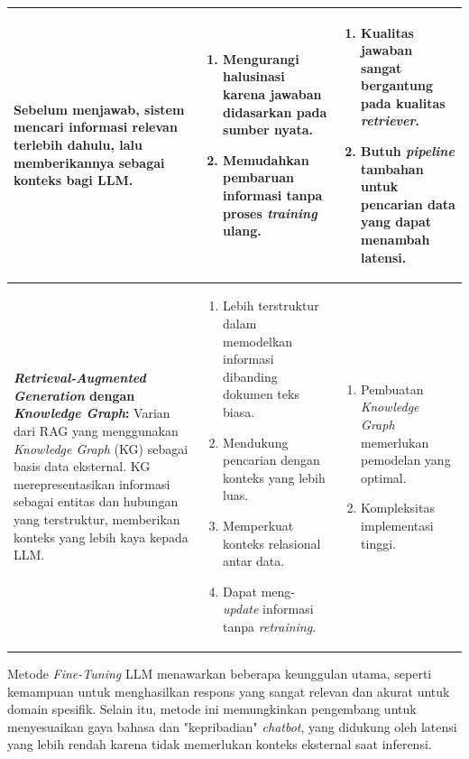\begin{longtable}{|p{4cm}|p{5cm}|p{5cm}|}
	Sebelum menjawab, sistem mencari informasi relevan terlebih dahulu, lalu memberikannya sebagai konteks bagi LLM.
	                &
	\begin{enumerate}
		\item Mengurangi halusinasi karena jawaban didasarkan pada sumber nyata.
		\item Memudahkan pembaruan informasi tanpa proses \textit{training} ulang.
	\end{enumerate}
	                &
	\begin{enumerate}
		\item Kualitas jawaban sangat bergantung pada kualitas \textit{retriever}.
		\item Butuh \textit{pipeline} tambahan untuk pencarian data yang dapat menambah latensi.
	\end{enumerate}
	\\
	\hline
	\textbf{\textit{Retrieval-Augmented Generation} dengan \textit{Knowledge Graph}: }
	Varian dari RAG yang menggunakan \textit{Knowledge Graph} (KG) sebagai basis data eksternal.
	KG merepresentasikan informasi sebagai entitas dan hubungan yang terstruktur, memberikan konteks yang lebih kaya kepada LLM.
	                &
	\begin{enumerate}
		\item Lebih terstruktur dalam memodelkan informasi dibanding dokumen teks biasa.
		\item Mendukung pencarian dengan konteks yang lebih luas.
		\item Memperkuat konteks relasional antar data.
		\item Dapat meng-\textit{update} informasi tanpa \textit{retraining}.
	\end{enumerate}
	                &
	\begin{enumerate}
		\item Pembuatan \textit{Knowledge Graph} memerlukan pemodelan yang optimal.
		\item Kompleksitas implementasi tinggi.
	\end{enumerate}
	\\
	\hline
\end{longtable}

Metode \textit{Fine-Tuning} LLM menawarkan beberapa keunggulan utama, seperti kemampuan untuk menghasilkan respons yang sangat relevan dan akurat untuk domain spesifik.
Selain itu, metode ini memungkinkan pengembang untuk menyesuaikan gaya bahasa dan "kepribadian" \textit{chatbot}, yang didukung oleh latensi yang lebih rendah karena tidak memerlukan konteks eksternal saat inferensi.

